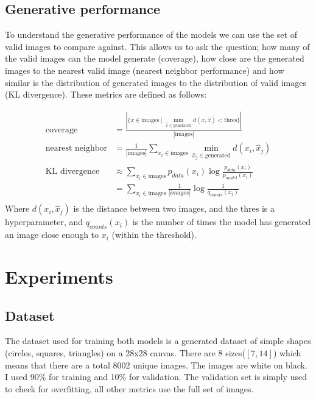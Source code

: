 \documentclass[conference,a4paper]{IEEEtran}
\begin{document}
\subsection{Generative performance}
To understand the generative performance of the models we can use the set of valid images to compare against. This allows us to ask the question; how many of the valid images can the model generate (coverage), how close are the generated images to the nearest valid image (nearest neighbor performance) and how similar is the distribution of generated images to the distribution of valid images (KL divergence). These metrics are defined as follows:

\begin{align*}
\text{coverage} &= \frac{|\{x \in \text{images} \mid \min_{\hat{x} \in \text{generated}} d(x, \hat{x}) < \text{thres}\}|}{|\text{images}|}\\
\text{nearest neighbor} &= \frac{1}{|\text{images}|} \sum_{x_i \in \text{images}} \min_{\hat{x}_j \in \text{generated}} d(x_i, \hat{x}_j)\\
\text{KL divergence} &\approx \sum_{x_i \in \text{images}} p_{data}(x_i) \log \frac{p_{data}(x_i)}{p_{model}(x_i)}\\
&= \sum_{x_i \in \text{images}} \frac{1}{|images|} \log \frac{1}{q_{counts}(x_i)}\\
\end{align*}
\noindent Where $d(x_i, \hat{x}_j)$ is the distance between two images, and the $\text{thres}$ is a hyperparameter, and $q_{counts}(x_i)$ is the number of times the model has generated an image close enough to $x_i$ (within the threshold).

\section{Experiments}

\subsection{Dataset}

The dataset used for training both models is a generated dataset of simple shapes (circles, squares, triangles) on a 28x28 canvas. There are 8 sizes($[7,14]$) which means that there are a total 8002 unique images. The images are white on black. I used 90\% for training and 10\% for validation. The validation set is simply used to check for overfitting, all other metrics use the full set of images.
\end{document}
